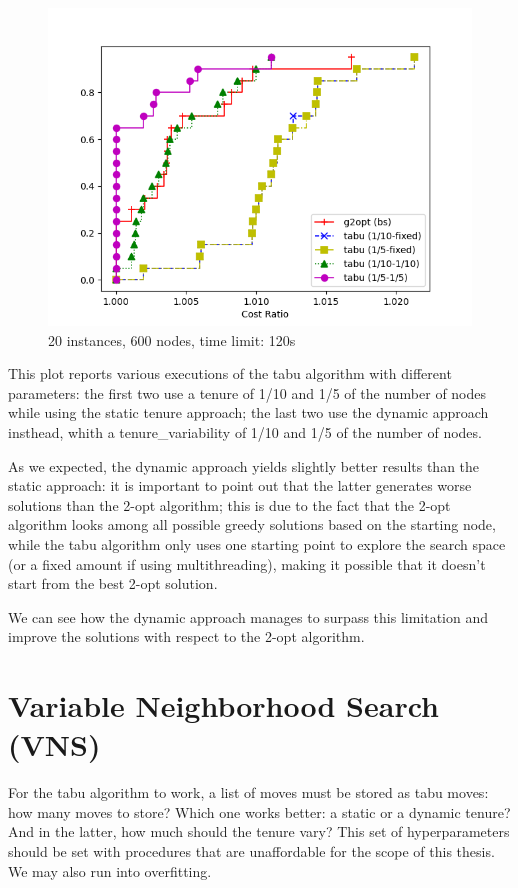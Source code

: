 \begin{figure}[h]
    \centering
    \includegraphics*[width=.6\textwidth]{../plots/perfprof_tabu_costs.png}
    \caption*{20 instances, 600 nodes, time limit: 120s}
\end{figure}
\FloatBarrier

This plot reports various executions of the tabu algorithm with different parameters: the first two use a tenure of 1/10 and 1/5 of the number of nodes while using the static tenure approach; the last two use the dynamic approach insthead, whith a tenure\_variability of 1/10 and 1/5 of the number of nodes.

As we expected, the dynamic approach yields slightly better results than the static approach: it is important to point out that the latter generates worse solutions than the 2-opt algorithm; this is due to the fact that the 2-opt algorithm looks among all possible greedy solutions based on the starting node, while the tabu algorithm only uses one starting point to explore the search space (or a fixed amount if using multithreading), making it possible that it doesn't start from the best 2-opt solution.

We can see how the dynamic approach manages to surpass this limitation and improve the solutions with respect to the 2-opt algorithm.

\section{Variable Neighborhood Search (VNS)}

For the tabu algorithm to work, a list of moves must be stored as tabu moves: how many moves to store? Which one works better: a static or a dynamic tenure? And in the latter, how much should the tenure vary? This set of hyperparameters should be set with procedures that are unaffordable for the scope of this thesis. We may also run into overfitting.

